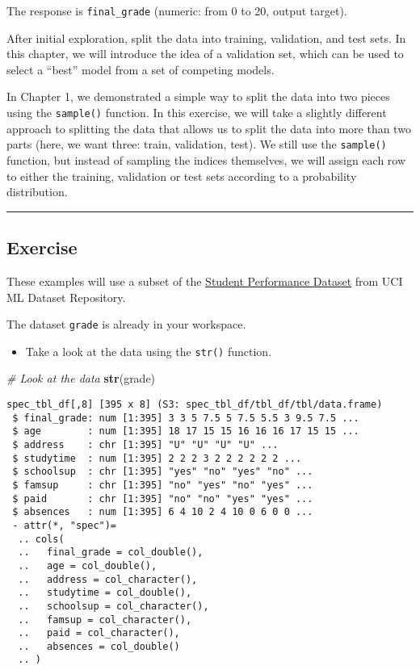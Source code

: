 \documentclass[
]{book}
\newenvironment{Shaded}{\begin{snugshade}}{\end{snugshade}}
\newcommand{\CommentTok}[1]{\textcolor[rgb]{0.56,0.35,0.01}{\textit{#1}}}
\newcommand{\KeywordTok}[1]{\textcolor[rgb]{0.13,0.29,0.53}{\textbf{#1}}}
\newcommand{\NormalTok}[1]{#1}
\providecommand{\tightlist}{%
  \setlength{\itemsep}{0pt}\setlength{\parskip}{0pt}}
\begin{document}
The response is \texttt{final\_grade} (numeric: from 0 to 20, output target).

After initial exploration, split the data into training, validation, and test sets. In this chapter, we will introduce the idea of a validation set, which can be used to select a ``best'' model from a set of competing models.

In Chapter 1, we demonstrated a simple way to split the data into two pieces using the \texttt{sample()} function. In this exercise, we will take a slightly different approach to splitting the data that allows us to split the data into more than two parts (here, we want three: train, validation, test). We still use the \texttt{sample()} function, but instead of sampling the indices themselves, we will assign each row to either the training, validation or test sets according to a probability distribution.

\begin{center}\rule{0.5\linewidth}{0.5pt}\end{center}

\hypertarget{exercise-4}{%
\subsection*{Exercise}\label{exercise-4}}

These examples will use a subset of the \href{https://archive.ics.uci.edu/ml/datasets/Student+Performance}{Student Performance Dataset} from UCI ML Dataset Repository.

The dataset \texttt{grade} is already in your workspace.

\begin{itemize}
\tightlist
\item
  Take a look at the data using the \texttt{str()} function.
\end{itemize}

\begin{Shaded}
\begin{Highlighting}[]
\CommentTok{# Look at the data}
\KeywordTok{str}\NormalTok{(grade)}
\end{Highlighting}
\end{Shaded}

\begin{verbatim}
spec_tbl_df[,8] [395 x 8] (S3: spec_tbl_df/tbl_df/tbl/data.frame)
 $ final_grade: num [1:395] 3 3 5 7.5 5 7.5 5.5 3 9.5 7.5 ...
 $ age        : num [1:395] 18 17 15 15 16 16 16 17 15 15 ...
 $ address    : chr [1:395] "U" "U" "U" "U" ...
 $ studytime  : num [1:395] 2 2 2 3 2 2 2 2 2 2 ...
 $ schoolsup  : chr [1:395] "yes" "no" "yes" "no" ...
 $ famsup     : chr [1:395] "no" "yes" "no" "yes" ...
 $ paid       : chr [1:395] "no" "no" "yes" "yes" ...
 $ absences   : num [1:395] 6 4 10 2 4 10 0 6 0 0 ...
 - attr(*, "spec")=
  .. cols(
  ..   final_grade = col_double(),
  ..   age = col_double(),
  ..   address = col_character(),
  ..   studytime = col_double(),
  ..   schoolsup = col_character(),
  ..   famsup = col_character(),
  ..   paid = col_character(),
  ..   absences = col_double()
  .. )
\end{verbatim}
\end{document}
